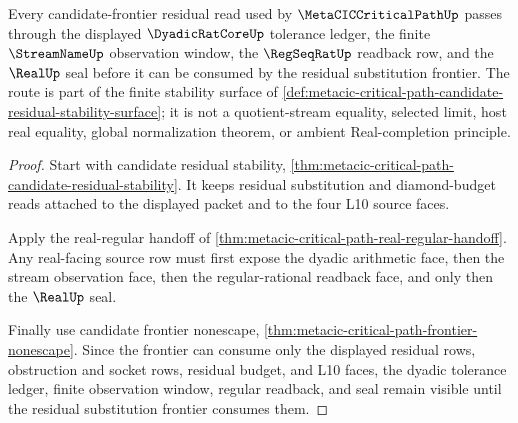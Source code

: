 \begin{theorem}
\label{thm:metacic-critical-path-l10-residual-dyadic-route}
Every candidate-frontier residual read used by $\MetaCICCriticalPathUp$ passes through the displayed $\DyadicRatCoreUp$ tolerance ledger, the finite $\StreamNameUp$ observation window, the $\RegSeqRatUp$ readback row, and the $\RealUp$ seal before it can be consumed by the residual substitution frontier. The route is part of the finite stability surface of \autoref{def:metacic-critical-path-candidate-residual-stability-surface}; it is not a quotient-stream equality, selected limit, host real equality, global normalization theorem, or ambient Real-completion principle.
\end{theorem}
\begin{proof}
Start with candidate residual stability, \autoref{thm:metacic-critical-path-candidate-residual-stability}. It keeps residual substitution and diamond-budget reads attached to the displayed packet and to the four L10 source faces.

Apply the real-regular handoff of \autoref{thm:metacic-critical-path-real-regular-handoff}. Any real-facing source row must first expose the dyadic arithmetic face, then the stream observation face, then the regular-rational readback face, and only then the $\RealUp$ seal.

Finally use candidate frontier nonescape, \autoref{thm:metacic-critical-path-frontier-nonescape}. Since the frontier can consume only the displayed residual rows, obstruction and socket rows, residual budget, and L10 faces, the dyadic tolerance ledger, finite observation window, regular readback, and seal remain visible until the residual substitution frontier consumes them.
\end{proof}


